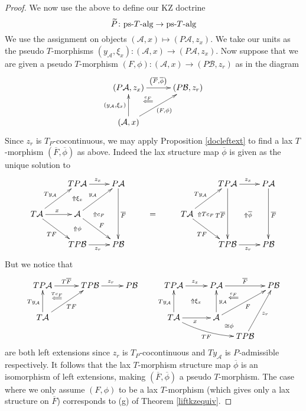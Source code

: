 \documentclass[a4paper,oneside,english]{amsart}
\numberwithin{equation}{section}
\numberwithin{figure}{section}
\theoremstyle{plain}
\theoremstyle{definition}
\theoremstyle{remark}
\theoremstyle{definition}
\theoremstyle{plain}
\theoremstyle{plain}
\theoremstyle{plain}
\begin{document}
\begin{proof}
We now use the above to define our KZ doctrine 
\[
\widetilde{P}\colon\text{ps-\ensuremath{T}-alg}\to\text{ps-\ensuremath{T}-alg}
\]
We use the assignment on objects $\left(\mathcal{A},x\right)\mapsto\left(P\mathcal{A},z_{x}\right)$.
We take our units as the pseudo $T$-morphisms $\left(y_{\mathcal{A}},\xi_{x}\right)\colon\left(\mathcal{A},x\right)\to\left(P\mathcal{A},z_{x}\right)$.
Now suppose that we are given a pseudo $T$-morphism $\left(F,\phi\right)\colon\left(\mathcal{A},x\right)\to\left(P\mathcal{B},z_{r}\right)$
as in the diagram
\[
\xymatrix@=1em{\left(P\mathcal{A},z_{x}\right)\ar[rr]^{\left(\overline{F},\overline{\phi}\right)}\ar@{}[dr]|-{\stackrel{c_{F}}{\Longleftarrow}} &  & \left(P\mathcal{B},z_{r}\right)\\
 & \;\\
\left(\mathcal{A},x\right)\ar[uurr]_{\left(F,\phi\right)}\ar[uu]^{\left(y_{\mathcal{A}},\xi_{x}\right)}
}
\]
Since $z_{r}$ is $T_{P}$-cocontinuous, we may apply Proposition
\ref{docleftext} to find a lax $T$-morphism $\left(\overline{F},\overline{\phi}\right)$
as above. Indeed the lax structure map $\overline{\phi}$ is given
as the unique solution to 
\[
\xymatrix{ & TP\mathcal{A}\ar[r]^{z_{x}} & P\mathcal{A}\ar[dd]^{\overline{F}} &  &  & TP\mathcal{A}\ar[r]^{z_{x}}\ar[dd]_{T\overline{F}} & P\mathcal{A}\ar[dd]^{\overline{F}}\\
T\mathcal{A}\ar[r]^{x}\ar[ur]^{Ty_{\mathcal{A}}}\ar[rd]_{TF} & \mathcal{A}\ar[dr]^{F}\ar[ur]^{y_{\mathcal{A}}}\ar@{}[r]|-{\Uparrow c_{F}}\ar@{}[u]|-{\Uparrow\xi_{x}} & \; & = & T\mathcal{A}\ar[ru]^{Ty_{\mathcal{A}}}\ar[rd]_{TF}\ar@{}[r]|-{\Uparrow Tc_{F}\quad} & \;\ar@{}[r]|-{\Uparrow\overline{\phi}} & \;\\
 & TP\mathcal{B}\ar[r]_{z_{r}}\ar@{}[u]|-{\Uparrow\phi} & P\mathcal{B} &  &  & TP\mathcal{B}\ar[r]_{z_{r}} & P\mathcal{B}
}
\]
But we notice that
\[
\xymatrix@=1em{TP\mathcal{A}\ar[rr]^{T\overline{F}}\ar@{}[dr]|-{\stackrel{Tc_{F}}{\Longleftarrow}} &  & TP\mathcal{B}\ar[rr]^{z_{r}} &  & P\mathcal{B} &  & TP\mathcal{A}\ar[rr]^{z_{x}} &  & P\mathcal{A}\ar[rr]^{\overline{F}} &  & P\mathcal{B}\\
 & \; &  &  &  &  &  &  &  & \;\ar@{}[ul]|-{\stackrel{c_{F}}{\Longleftarrow}}\\
T\mathcal{A}\ar[uu]^{Ty_{\mathcal{A}}}\ar[rruu]_{TF} &  &  &  &  &  & T\mathcal{A}\ar[rr]_{x}\ar[uu]^{Ty_{\mathcal{A}}}\ar@{}[urur]|-{\Uparrow\xi_{x}}\ar@/_{0.5pc}/[rrrd]_{TF} &  & \mathcal{A}\ar[uu]_{y_{\mathcal{A}}}\ar[uurr]_{F}\ar@{}[dr]|-{\cong\phi}\\
 &  &  &  &  &  &  &  &  & TP\mathcal{B}\ar[uuru]_{z_{r}}
}
\]
are both left extensions since $z_{r}$ is $T_{P}$-cocontinuous and
$Ty_{\mathcal{A}}$ is \emph{$P$-}admissible respectively. It follows
that the lax $T$-morphism structure map $\overline{\phi}$ is an
isomorphism of left extensions, making $\left(\overline{F},\overline{\phi}\right)$
a pseudo $T$-morphism. The case where we only assume $\left(F,\phi\right)$
to be a lax $T$-morphism (which gives only a lax structure on $\overline{F}$)
corresponds to (g) of Theorem \ref{liftkzequiv}.


\end{proof}
\end{document}
